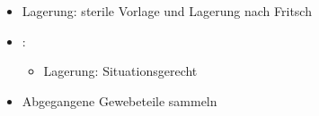 \label{m:abort}
\begin{itemize}
  \item Lagerung: sterile Vorlage und Lagerung nach
  Fritsch
  \item \TxBeiVit: \TxMassVitMKBes
  \begin{itemize}
    \item Lagerung: Situationsgerecht
  \end{itemize}
  \item Abgegangene Gewebeteile sammeln
\end{itemize}